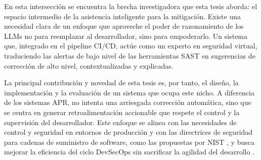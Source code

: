 En esta intersección se encuentra la brecha investigadora que esta tesis aborda: el espacio intermedio de la asistencia inteligente para la mitigación. Existe una necesidad clara de un enfoque que aproveche el poder de razonamiento de los LLMs no para reemplazar al desarrollador, sino para empoderarlo. Un sistema que, integrado en el pipeline CI/CD, actúe como un experto en seguridad virtual, traduciendo las alertas de bajo nivel de las herramientas SAST en sugerencias de corrección de alto nivel, contextualizadas y explicadas.

La principal contribución y novedad de esta tesis es, por tanto, el diseño, la implementación y la evaluación de un sistema que ocupa este nicho. A diferencia de los sistemas APR, no intenta una arriesgada corrección automática, sino que se centra en generar retroalimentación accionable que respete el control y la supervisión del desarrollador. Este enfoque se alinea con las necesidades de control y seguridad en entornos de producción y con las directrices de seguridad para cadenas de suministro de software, como las propuestas por NIST \cite{NIST2024CICDSecurity}, y busca mejorar la eficiencia del ciclo DevSecOps sin sacrificar la agilidad del desarrollo \cite{Laukkanen2017BenefitsChallengesCICD, Myrbakken2019DevSecOpsSLR}.
